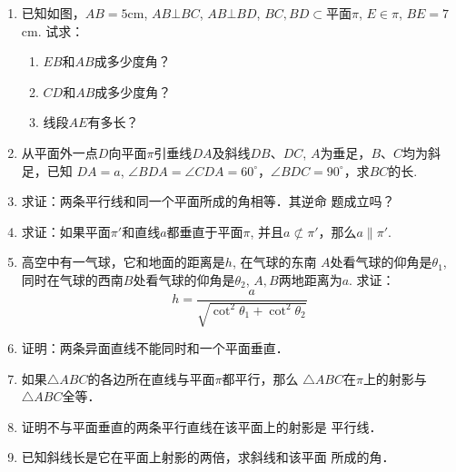 \begin{enumerate}
\begin{figure}[htp]
\begin{minipage}[t]{0.48\textwidth}
\begin{tikzpicture}[>=latex, scale=1]
  \end{tikzpicture}
  \caption*{第9题}
  \end{minipage}
  \begin{minipage}[t]{0.48\textwidth}
  \centering
  \caption*{第12题}
  \end{minipage}
\end{figure}

\item 已知如图，$AB=5$cm, 
$AB\bot BC$, $AB\bot BD$, $BC,BD\subset $平面$\pi$, $E\in\pi$, $BE=7$cm. 试求：
\begin{enumerate}
  \item $EB$和$AB$成多少度角？
  \item $CD$和$AB$成多少度角？
  \item 线段$AE$有多长？
\end{enumerate}
\item 从平面外一点$D$向平面$\pi$引垂线$DA$及斜线$DB$、$DC$, 
$A$为垂足，$B$、$C$均为斜足，已知 $DA=a$, $\angle BDA=\angle CDA=60^{\circ}$，$\angle BDC=90^{\circ}$，求$BC$的长.
\item 求证：两条平行线和同一个平面所成的角相等．其逆命
题成立吗？
\item 求证：如果平面$\pi'$和直线$a$都垂直于平面$\pi$, 并且$a\not\subset\pi'$，那么$a\parallel \pi'$.

\item 高空中有一气球，它和地面的距离是$h$, 在气球的东南
$A$处看气球的仰角是$\theta_1$, 同时在气球的西南$B$处看气球的仰角是$\theta_2$, $A,B$两地距离为$a$. 求证：
\[h=\frac{a}{\sqrt{\cot^2\theta_1+\cot^2\theta_2}}\]
\item 证明：两条异面直线不能同时和一个平面垂直．
\item 如果$\triangle ABC$的各边所在直线与平面$\pi$都平行，那么
$\triangle ABC$在$\pi$上的射影与$\triangle ABC$全等．
\item 证明不与平面垂直的两条平行直线在该平面上的射影是
平行线．
\item 已知斜线长是它在平面上射影的两倍，求斜线和该平面
所成的角．


\end{enumerate}
